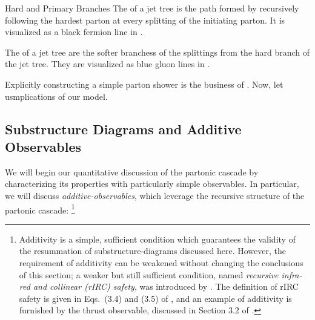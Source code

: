\begin{definitionbox}{Hard and Primary Branches}{}
    The  of a jet tree is the path formed by recursively following the hardest parton at every splitting of the initiating parton.
    It is visualized as a black fermion line in .

    The  of a jet tree are the softer branchess of the splittings from the hard branch of the jet tree.
    They are visualized as blue gluon lines in .
\end{definitionbox}

Explicitly constructing a simple parton shower is the business of .
%
Now, let usmplications of our model.


\subsection{Substructure Diagrams and Additive Observables}
\label{sec:ll-substructure-diagrams}

We will begin our quantitative discussion of the partonic cascade by characterizing its properties with particularly simple observables.
%
In particular, we will discuss \emph{\glspl{additive-observable}}, which leverage the recursive structure of the partonic cascade:%
\footnote{
    Additivity is a simple, sufficient condition which guarantees the validity of the resummation of \glspl{substructure-diagram} discussed here.
    However, the requirement of additivity can be weakened without changing the conclusions of this section;
    a weaker but still sufficient condition, named \textit{recursive infra-red and collinear (rIRC) safety}, was introduced by .
    The definition of rIRC safety is given in Eqs.\ (3.4) and (3.5) of , and an example of additivity is furnished by the thrust observable, discussed in Section 3.2 of .
}

